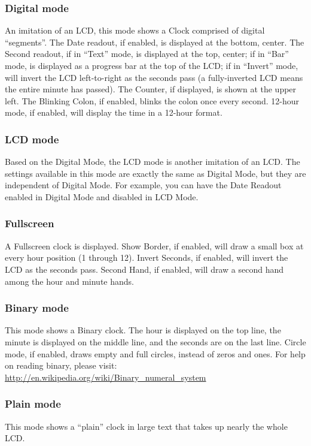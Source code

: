 \subsubsection{Digital mode}
An imitation of an LCD, this mode shows a Clock comprised of digital ``segments''.
The Date readout, if enabled, is displayed at the bottom, center.
The Second readout, if in ``Text'' mode, is displayed at the top, center; if in ``Bar'' mode, is displayed as a progress bar at the top of the LCD; if in ``Invert'' mode, will invert the LCD left-to-right as the seconds pass (a fully-inverted LCD means the entire minute has passed).
The Counter, if displayed, is shown at the upper left.
The Blinking Colon, if enabled, blinks the colon once every second.
12-hour mode, if enabled, will display the time in a 12-hour format.

\subsubsection{LCD mode}
Based on the Digital Mode, the LCD mode is another imitation of an LCD.
The settings available in this mode are exactly the same as Digital Mode, but they are independent of Digital Mode.
For example, you can have the Date Readout enabled in Digital Mode and disabled in LCD Mode.

\subsubsection{Fullscreen}
A Fullscreen clock is displayed. Show Border, if enabled, will draw a small box at every hour position (1 through 12).
Invert Seconds, if enabled, will invert the LCD as the seconds pass.
Second Hand, if enabled, will draw a second hand among the hour and minute hands.

\subsubsection{Binary mode}
This mode shows a Binary clock.
The hour is displayed on the top line, the minute is displayed on the middle line, and the seconds are on the last line.
Circle mode, if enabled, draws empty and full circles, instead of zeros and ones.
For help on reading binary, please visit: \url{http://en.wikipedia.org/wiki/Binary_numeral_system}

\subsubsection{Plain mode}
This mode shows a ``plain'' clock in large text that takes up nearly the whole LCD.

